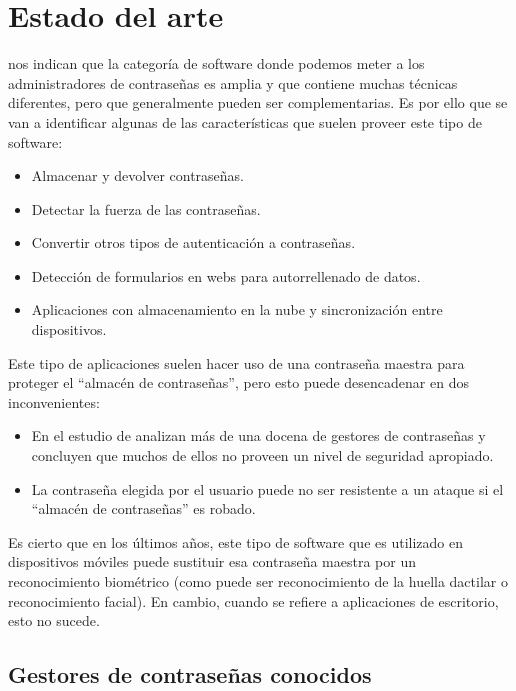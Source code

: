 \documentclass{\ClassPath/viu-tfm-template}
\begin{document}
\chapter{Estado del arte}

\textcite{tapas} nos indican que la categoría de software donde podemos meter a los administradores de contraseñas es amplia y que contiene muchas técnicas diferentes, pero que generalmente pueden ser complementarias. Es por ello que se van a identificar algunas de las características que suelen proveer este tipo de software:

\begin{itemize}
    \item Almacenar y devolver contraseñas.
    \item Detectar la fuerza de las contraseñas.
    \item Convertir otros tipos de autenticación a contraseñas.
    \item Detección de formularios en webs para autorrellenado de datos.
    \item Aplicaciones con almacenamiento en la nube y sincronización entre dispositivos.
\end{itemize}

Este tipo de aplicaciones suelen hacer uso de una contraseña maestra para proteger el “almacén de contraseñas”, pero esto puede desencadenar en dos inconvenientes:

\begin{itemize}
    \item En el estudio de \textcite{belenko2012secure} analizan más de una docena de gestores de contraseñas y concluyen que muchos de ellos no proveen un nivel de seguridad apropiado.

    \item La contraseña elegida por el usuario puede no ser resistente a un ataque si el “almacén de contraseñas” es robado.
\end{itemize}

Es cierto que en los últimos años, este tipo de software que es utilizado en dispositivos móviles puede sustituir esa contraseña maestra por un reconocimiento biométrico (como puede ser reconocimiento de la huella dactilar o reconocimiento facial). En cambio, cuando se refiere a aplicaciones de escritorio, esto no sucede.


\section{Gestores de contraseñas conocidos}
\end{document}
